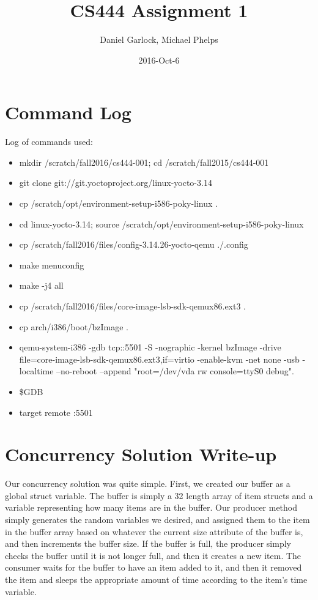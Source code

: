\documentclass[letterpaper,10pt,titlepage]{article}
\title{CS444 Assignment 1}
\author{Daniel Garlock, Michael Phelps}
\date{2016-Oct-6}
\begin{document}
\maketitle

\newpage
\tableofcontents
\newpage

\section{Command Log}
Log of commands used:\\
    \begin{itemize}
        \item mkdir /scratch/fall2016/cs444-001; cd /scratch/fall2015/cs444-001\\
        \item git clone git://git.yoctoproject.org/linux-yocto-3.14\\
        \item cp /scratch/opt/environment-setup-i586-poky-linux .\\
	\item cd linux-yocto-3.14; source /scratch/opt/environment-setup-i586-poky-linux\\
        \item cp /scratch/fall2016/files/config-3.14.26-yocto-qemu ./.config\\
	\item make menuconfig\\
        \item make -j4 all\\
        \item cp /scratch/fall2016/files/core-image-lsb-sdk-qemux86.ext3 .\\
	\item cp arch/i386/boot/bzImage .\\
	\item qemu-system-i386 -gdb tcp::5501 -S -nographic -kernel bzImage -drive file=core-image-lsb-sdk-qemux86.ext3,if=virtio -enable-kvm -net none -usb -localtime --no-reboot --append "root=/dev/vda rw console=ttyS0 debug".\\
        \item \$GDB
        \item target remote :5501
    \end{itemize}

\section{Concurrency Solution Write-up}
    Our concurrency solution was quite simple. First, we created our buffer as a global struct variable. The buffer is simply a 32 length array of item structs and a variable representing how many items are in the buffer. Our producer method simply generates the random variables we desired, and assigned them to the item in the buffer array based on whatever the current size attribute of the buffer is, and then increments the buffer size. If the buffer is full, the producer simply checks the buffer until it is not longer full, and then it creates a new item. The consumer waits for the buffer to have an item added to it, and then it removed the item and sleeps the appropriate amount of time according to the item's time variable.
\end{document}
